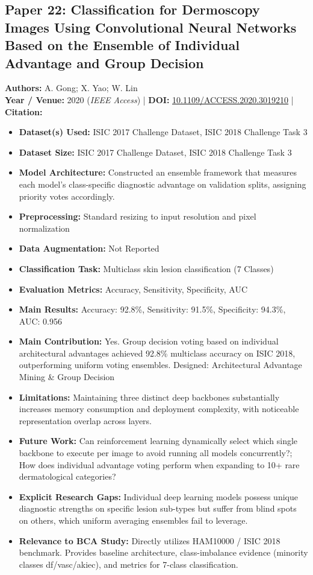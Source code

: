 \documentclass[11pt,a4paper]{article}
\begin{document}
\subsection{Paper 22: Classification for Dermoscopy Images Using Convolutional Neural Networks Based on the Ensemble of Individual Advantage and Group Decision}
\textbf{Authors:} A. Gong; X. Yao; W. Lin \\
\textbf{Year / Venue:} 2020 (\textit{IEEE Access}) | \textbf{DOI:} \href{https://doi.org/10.1109/ACCESS.2020.3019210}{10.1109/ACCESS.2020.3019210} | \textbf{Citation:} \cite{9175002}

\begin{itemize}\small
\item \textbf{Dataset(s) Used:} ISIC 2017 Challenge Dataset, ISIC 2018 Challenge Task 3
\item \textbf{Dataset Size:} ISIC 2017 Challenge Dataset, ISIC 2018 Challenge Task 3
\item \textbf{Model Architecture:} Constructed an ensemble framework that measures each model's class-specific diagnostic advantage on validation splits, assigning priority votes accordingly.
\item \textbf{Preprocessing:} Standard resizing to input resolution and pixel normalization
\item \textbf{Data Augmentation:} Not Reported
\item \textbf{Classification Task:} Multiclass skin lesion classification (7 Classes)
\item \textbf{Evaluation Metrics:} Accuracy, Sensitivity, Specificity, AUC
\item \textbf{Main Results:} Accuracy: 92.8\%, Sensitivity: 91.5\%, Specificity: 94.3\%, AUC: 0.956
\item \textbf{Main Contribution:} Yes. Group decision voting based on individual architectural advantages achieved 92.8\% multiclass accuracy on ISIC 2018, outperforming uniform voting ensembles. Designed: Architectural Advantage Mining \& Group Decision
\item \textbf{Limitations:} Maintaining three distinct deep backbones substantially increases memory consumption and deployment complexity, with noticeable representation overlap across layers.
\item \textbf{Future Work:} Can reinforcement learning dynamically select which single backbone to execute per image to avoid running all models concurrently?; How does individual advantage voting perform when expanding to 10+ rare dermatological categories?
\item \textbf{Explicit Research Gaps:} Individual deep learning models possess unique diagnostic strengths on specific lesion sub-types but suffer from blind spots on others, which uniform averaging ensembles fail to leverage.
\item \textbf{Relevance to BCA Study:} Directly utilizes HAM10000 / ISIC 2018 benchmark. Provides baseline architecture, class-imbalance evidence (minority classes df/vasc/akiec), and metrics for 7-class classification.
\end{itemize}
\end{document}
